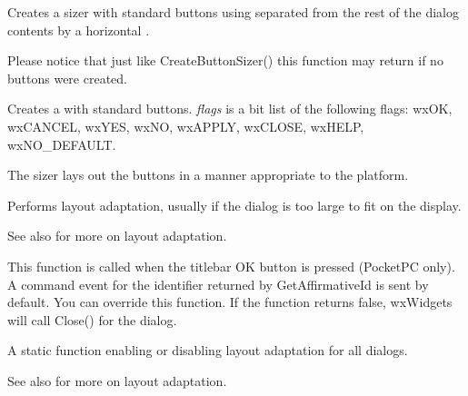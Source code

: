\label{wxdialogcreateseparatedbuttonsizer}


Creates a sizer with standard buttons using 
 separated from the rest
of the dialog contents by a horizontal .

Please notice that just like CreateButtonSizer() this function may return \NULL 
if no buttons were created.


\label{wxdialogcreatestddialogbuttonsizer}


Creates a  with standard buttons. {\it flags} is a bit list
of the following flags: wxOK, wxCANCEL, wxYES, wxNO, wxAPPLY, wxCLOSE,
wxHELP, wxNO\_DEFAULT.

The sizer lays out the buttons in a manner appropriate to the platform.

\label{wxdialogdolayoutadaptation}


Performs layout adaptation, usually if the dialog is too large to fit on the display.

See also  for more on layout adaptation.

\label{wxdialogdook}


This function is called when the titlebar OK button is pressed (PocketPC only).
A command event for the identifier returned by GetAffirmativeId is sent by
default. You can override this function. If the function returns false, wxWidgets
will call Close() for the dialog.

\label{wxdialogenablelayoutadaptation}


A static function enabling or disabling layout adaptation for all dialogs.

See also  for more on layout adaptation.


